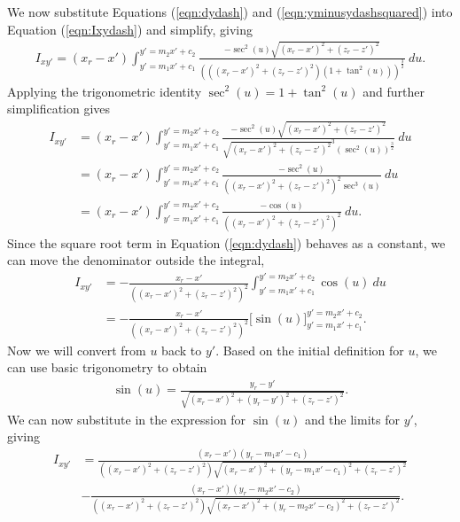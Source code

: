 We now substitute Equations (\ref{eqn:dydash}) and (\ref{eqn:yminusydashsquared}) into Equation (\ref{eqn:Ixydash}) and simplify, giving
\begin{align}
    I_{xy'} = \left(x_r-x'\right)\int_{y'=m_1x'+c_1}^{y'=m_2x'+c_2} \frac{-\sec^2\left(u\right)\sqrt{\left(x_r-x'\right)^2+\left(z_r-z'\right)^2}}{\left(\left(\left(x_r-x'\right)^2+\left(z_r-z'\right)^2\right)\left(1+\tan^2\left(u\right)\right)\right)^\frac{3}{2}}\ du \text{.}
\end{align}
Applying the trigonometric identity \(\sec^2\left(u\right) = 1+\tan^2\left(u\right)\) and further simplification gives
\begin{align}
    I_{xy'} &= \left(x_r-x'\right)\int_{y'=m_1x'+c_1}^{y'=m_2x'+c_2} \frac{-\sec^2\left(u\right)\sqrt{\left(x_r-x'\right)^2+\left(z_r-z'\right)^2}}{\sqrt{\left(x_r-x'\right)^2+\left(z_r-z'\right)^2}^3\left(\sec^2\left(u\right)\right)^\frac{3}{2}}\ du \\
    &= \left(x_r-x'\right)\int_{y'=m_1x'+c_1}^{y'=m_2x'+c_2} \frac{-\sec^2\left(u\right)}{\left(\left(x_r-x'\right)^2+\left(z_r-z'\right)^2\right)^2\sec^3\left(u\right)}\ du \\
    &= \left(x_r-x'\right)\int_{y'=m_1x'+c_1}^{y'=m_2x'+c_2} \frac{-\cos\left(u\right)}{\left(\left(x_r-x'\right)^2+\left(z_r-z'\right)^2\right)^2}\ du \text{.}
\end{align}
Since the square root term in Equation (\ref{eqn:dydash}) behaves as a constant, we can move the denominator outside the integral,
\begin{align}
    I_{xy'} &= -\frac{x_r-x'}{\left(\left(x_r-x'\right)^2+\left(z_r-z'\right)^2\right)^2}\int_{y'=m_1x'+c_1}^{y'=m_2x'+c_2} \cos\left(u\right)\ du \\
    &= -\frac{x_r-x'}{\left(\left(x_r-x'\right)^2+\left(z_r-z'\right)^2\right)^2} \Big[\sin\left(u\right)\Big]_{y'=m_1x'+c_1}^{y'=m_2x'+c_2} \text{.}
\end{align}
Now we will convert from \(u\) back to \(y'\). Based on the initial definition for \(u\), we can use basic trigonometry to obtain
\begin{align}
    \sin\left(u\right) = \frac{y_r-y'}{\sqrt{\left(x_r-x'\right)^2+\left(y_r-y'\right)^2+\left(z_r-z'\right)^2}} \text{.}
\end{align}
We can now substitute in the expression for \(\sin\left(u\right)\) and the limits for \(y'\), giving
\begin{align}
    I_{xy'} &= \frac{\left(x_r-x'\right)\left(y_r-m_1x'-c_1\right)}{\left(\left(x_r-x'\right)^2+\left(z_r-z'\right)^2\right)\sqrt{\left(x_r-x'\right)^2+\left(y_r-m_1x'-c_1\right)^2+\left(z_r-z'\right)^2}} \nonumber \\
    & -\frac{\left(x_r-x'\right)\left(y_r-m_2x'-c_2\right)}{\left(\left(x_r-x'\right)^2+\left(z_r-z'\right)^2\right)\sqrt{\left(x_r-x'\right)^2+\left(y_r-m_2x'-c_2\right)^2+\left(z_r-z'\right)^2}} \text{.}
\end{align}
